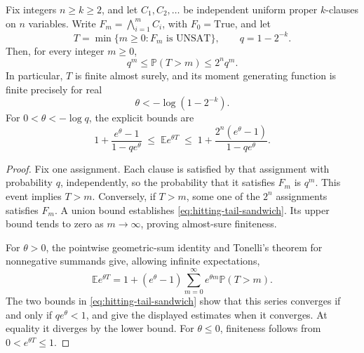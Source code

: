 \begin{proposition}
\label{prop:hitting-mgf-boundary}
Fix integers $n\ge k\ge2$, and let $C_1,C_2,\ldots$ be independent
uniform proper $k$-clauses on $n$ variables. Write
$F_m=\bigwedge_{i=1}^m C_i$, with $F_0=\mathrm{True}$, and let
\[
 T=\min\{m\ge0:F_m\text{ is UNSAT}\},\qquad q=1-2^{-k}.
\]
Then, for every integer $m\ge0$,
\begin{equation}
 q^m\le \mathbb P(T>m)\le 2^nq^m.
 \label{eq:hitting-tail-sandwich}
\end{equation}
In particular, $T$ is finite almost surely, and its moment generating
function is finite precisely for real
\[
 \theta< -\log(1-2^{-k}).
\]
For $0<\theta< -\log q$, the explicit bounds are
\[
 1+\frac{e^\theta-1}{1-qe^\theta}
 \;\le\;\mathbb E e^{\theta T}
 \;\le\;1+\frac{2^n(e^\theta-1)}{1-qe^\theta}.
\]
\end{proposition}
\begin{proof}
Fix one assignment. Each clause is satisfied by that assignment with
probability $q$, independently, so the probability that it satisfies
$F_m$ is $q^m$. This event implies $T>m$. Conversely, if $T>m$, some
one of the $2^n$ assignments satisfies $F_m$. A union bound establishes
\eqref{eq:hitting-tail-sandwich}. Its upper bound tends to zero as
$m\to\infty$, proving almost-sure finiteness.

For $\theta>0$, the pointwise geometric-sum identity and Tonelli's
theorem for nonnegative summands give, allowing infinite expectations,
\[
 \mathbb E e^{\theta T}
 =1+(e^\theta-1)\sum_{m=0}^{\infty}
                  e^{\theta m}\mathbb P(T>m).
\]
The two bounds in \eqref{eq:hitting-tail-sandwich} show that this series
converges if and only if $qe^\theta<1$, and give the displayed estimates
when it converges. At equality it diverges by the lower bound. For
$\theta\le0$, finiteness follows from $0<e^{\theta T}\le1$.
\end{proof}

